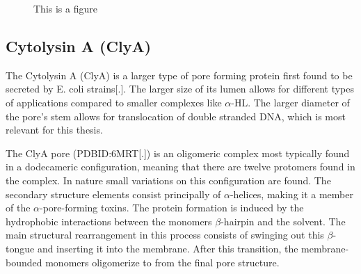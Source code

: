 \begin{figure}[ht]
\begin{centering}
  \caption{This is a figure}
  \label{fig:alphaHL}
  \end{centering}
\end{figure}

\newpage
\subsection{Cytolysin A (ClyA)}

The Cytolysin A (ClyA) is a larger type of pore forming protein first found to be
secreted by E. coli strains[.]. The larger size of its lumen allows for different types
of applications compared to smaller complexes like $\alpha$-HL. The larger diameter of
the pore's stem allows for translocation of double stranded DNA, which is most relevant
for this thesis.

The ClyA pore (PDBID:6MRT[.]) is an oligomeric complex most typically found in a
 dodecameric configuration, meaning that there are twelve protomers found in the
complex. In nature small variations on this configuration are found. The secondary
structure elements consist principally of $\alpha$-helices, making it a member of the $
\alpha$-pore-forming toxins. The protein formation is induced by the hydrophobic
interactions between the monomers $\beta$-hairpin and the solvent. The main
structural rearrangement in this process consists of swinging out this $\beta$-tongue and
inserting it into the membrane. After this transition, the membrane-bounded monomers
oligomerize to from the final pore structure.

